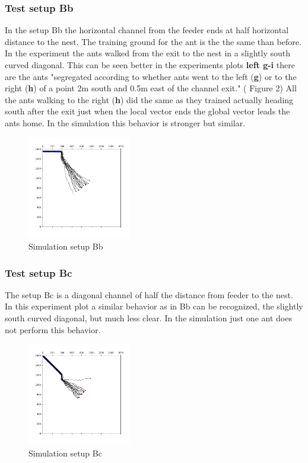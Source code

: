 \documentclass[11pt]{article}
\begin{document}
	\subsubsection{Test setup Bb}
		In the setup Bb the horizontal channel from the feeder ends at half horizontal distance to the nest. The training ground for the ant is the the same than before. \\
In the experiment the ants walked from the exit to the nest in a slightly south curved diagonal. This can be seen better in the experiments plots \textbf{left g-i} there are the ants "segregated according to whether ants went to the left (\textbf{g}) or to the right (\textbf{h}) of a point 2m south and 0.5m east of the channel exit." (\cite{wehner} Figure 2) All the ants walking to the right (\textbf{h}) did the same as they trained actually heading south after the exit just when the local vector ends the global vector leads the ants home. In the simulation this behavior is stronger but similar.
\begin{figure}
	\includegraphics[width=0.4\textwidth]{test_Bb.png}
	\caption{Simulation setup Bb}
	\label{fig:Bb}
\end{figure}
		\subsubsection{Test setup Bc}
The setup Bc is a diagonal channel of half the distance from feeder to the nest. \\
In this experiment plot a similar behavior as in Bb can be recognized, the slightly south curved diagonal, but much less clear. In the simulation just one ant does not perform this behavior.
\begin{figure}
	\includegraphics[width=0.4\textwidth]{test_Bc.png}
	\caption{Simulation setup Bc}
	\label{fig:Bc}
\end{figure}
\end{document}
